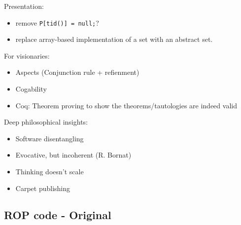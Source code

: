 Presentation:
\begin{itemize}
\item remove \texttt{P[tid()] = null;}?
\item replace array-based implementation of a set with an abstract set. 
\end{itemize}

For visionaries:
\begin{itemize}
\item
Aspects (Conjunction rule + refienment)
\item 
Cogability
\item
Coq: Theorem proving to show the theorems/tautologies are indeed valid
\end{itemize}


Deep philosophical insights:
\begin{itemize}
\item
Software disentangling
\item
Evocative, but incoherent (R. Bornat)
\item
Thinking doesn't scale
\item
Carpet publishing
\end{itemize}


\appendix 

\subsection{ROP code - Original}

